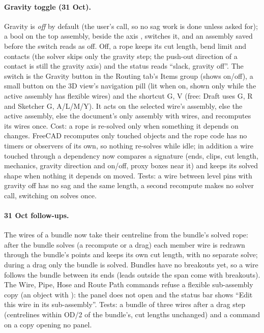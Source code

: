 \paragraph{Gravity toggle (31 Oct).} Gravity is \emph{off} by default (the user's call, so no sag work is done unless
asked for); a bool  on the top assembly, beside the axis , switches it, and an
assembly saved before the switch reads as off. Off, a rope keeps its cut length, bend limit and contacts (the solver
skips only the gravity step; the push-out direction of a contact is still the gravity axis) and the status reads
``slack, gravity off''. The switch is the Gravity button in the Routing tab's Items group (shows on/off), a small
button on the 3D view's navigation pill (lit when on, shown only while the active assembly has flexible wires) and the
shortcut G, V (free: Draft uses G, R and Sketcher G, A/L/M/Y). It acts on the selected wire's assembly, else the active
assembly, else the document's only assembly with wires, and recomputes its wires once. Cost: a rope is re-solved only
when something it depends on changes. FreeCAD recomputes only touched objects and the rope code has no timers or
observers of its own, so nothing re-solves while idle; in addition a wire touched through a dependency now compares a
signature (ends, clips, cut length, mechanics, gravity direction and on/off, proxy boxes near it) and keeps its solved
shape when nothing it depends on moved. Tests: a wire between level pins with gravity off has no sag and the same
length, a second recompute makes no solver call, switching on solves once.

\paragraph{31 Oct follow-ups.} The wires of a bundle now take their centreline from the bundle's solved rope: after the
bundle solves (a recompute or a drag) each member wire is redrawn through the bundle's points and keeps its own cut
length, with no separate solve; during a drag only the bundle is solved. Bundles have no breakouts yet, so a wire follows
the bundle between its ends (leads outside the span come with breakouts). The Wire, Pipe, Hose and Route Path commands
refuse a flexible sub-assembly copy (an object with ): the panel does not open and the status bar shows
``Edit this wire in its sub-assembly''. Tests: a bundle of three wires after a drag step (centrelines within OD/2 of the
bundle's, cut lengths unchanged) and a command on a copy opening no panel.
